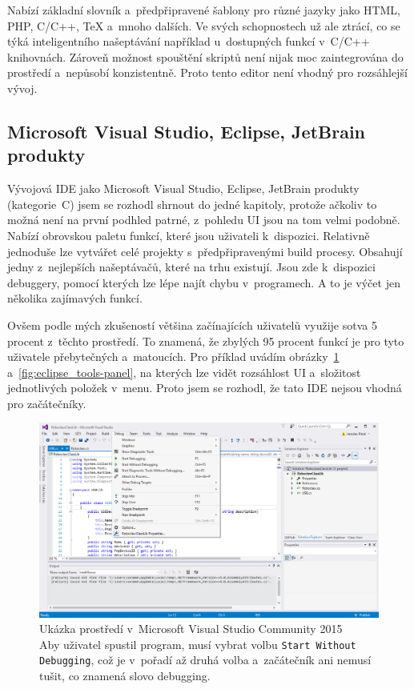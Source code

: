 Nabízí základní slovník a~předpřipravené šablony pro různé jazyky jako HTML, PHP, C/C++, TeX a~mnoho dalších.
Ve svých schopnostech už ale ztrácí, co se týká inteligentního našeptávání například u~dostupných funkcí v~C/C++ knihovnách.
%
Zároveň možnost spouštění skriptů není nijak moc zaintegrována do prostředí a~nepůsobí konzistentně.
Proto tento editor není vhodný pro rozsáhlejší vývoj.

\subsection{Microsoft Visual Studio, Eclipse, JetBrain produkty}


Vývojová IDE jako Microsoft Visual Studio, Eclipse, JetBrain produkty (kategorie~C) jsem se rozhodl shrnout do jedné kapitoly, protože ačkoliv to možná není na první podhled patrné, z~pohledu UI jsou na tom velmi podobně.
Nabízí obrovskou paletu funkcí, které jsou uživateli k~dispozici. 
Relativně jednoduše lze vytvářet celé projekty s~předpřipravenými build procesy. 
Obsahují jedny z~nejlepších našeptávačů, které na trhu existují. 
Jsou zde k~dispozici debuggery, pomocí kterých lze lépe najít chybu v~programech.
A to je výčet jen několika zajímavých funkcí.

Ovšem podle mých zkušeností většina začínajících uživatelů využije sotva 5 procent z~těchto prostředí. 
To znamená, že zbylých 95 procent funkcí je pro tyto uživatele přebytečných a~matoucích.  
Pro příklad uvádím obrázky~\ref{fig:visual-studio-community-2015} a~\ref{fig:eclipse_tools-panel}, na kterých lze vidět rozsáhlost UI a~složitost jednotlivých položek v~menu.
Proto jsem se rozhodl, že tato IDE nejsou vhodná pro začátečníky. 

\begin{figure}[h]
    \centering
    \includegraphics[width=\textwidth]{images/visual-studio_debug.png}
    \caption[Ukázka prostředí v~Microsoft Visual Studio Community 2015]{Ukázka prostředí v~Microsoft Visual Studio Community 2015 \\
    Aby uživatel spustil program, musí vybrat volbu \texttt{Start Without Debugging}, což je v~pořadí až druhá volba a~začátečník ani nemusí tušit, co znamená slovo debugging. 
    }
    \label{fig:visual-studio-community-2015}
\end{figure}

